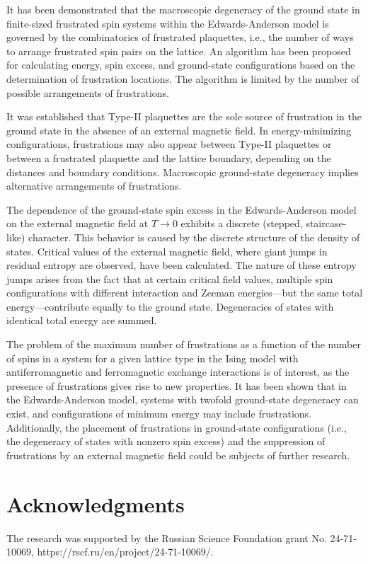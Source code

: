 \documentclass[utf8, babel, sor, jor, amsmath, amssymb, reprint]{elsarticle} %
\begin{document}
It has been demonstrated that the macroscopic degeneracy of the ground state in finite-sized frustrated spin systems within the Edwards-Anderson model is governed by the combinatorics of frustrated plaquettes, i.e., the number of ways to arrange frustrated spin pairs on the lattice. An algorithm has been proposed for calculating energy, spin excess, and ground-state configurations based on the determination of frustration locations. The algorithm is limited by the number of possible arrangements of frustrations.

It was established that Type-II plaquettes are the sole source of frustration in the ground state in the absence of an external magnetic field. In energy-minimizing configurations, frustrations may also appear between Type-II plaquettes or between a frustrated plaquette and the lattice boundary, depending on the distances and boundary conditions. Macroscopic ground-state degeneracy implies alternative arrangements of frustrations.

The dependence of the ground-state spin excess in the Edwards-Anderson model on the external magnetic field at $T \to 0$ exhibits a discrete (stepped, staircase-like) character. This behavior is caused by the discrete structure of the density of states. Critical values of the external magnetic field, where giant jumps in residual entropy are observed, have been calculated. The nature of these entropy jumps arises from the fact that at certain critical field values, multiple spin configurations with different interaction and Zeeman energies—but the same total energy—contribute equally to the ground state. Degeneracies of states with identical total energy are summed.

The problem of the maximum number of frustrations as a function of the number of spins in a system for a given lattice type in the Ising model with antiferromagnetic and ferromagnetic exchange interactions is of interest, as the presence of frustrations gives rise to new properties. It has been shown that in the Edwards-Anderson model, systems with twofold ground-state degeneracy can exist, and configurations of minimum energy may include frustrations. Additionally, the placement of frustrations in ground-state configurations (i.e., the degeneracy of states with nonzero spin excess) and the suppression of frustrations by an external magnetic field could be subjects of further research.


\section{Acknowledgments}

The research was supported by the Russian Science Foundation grant No. 24-71-10069, https://rscf.ru/en/project/24-71-10069/.


\end{document}
